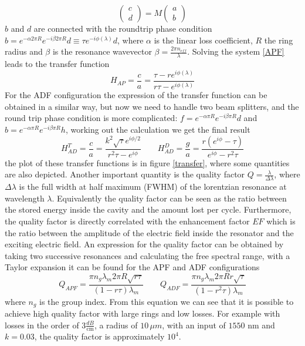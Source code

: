 \begin{equation}\label{APF}\begin{pmatrix}c \\ d \end{pmatrix} = M \begin{pmatrix}a\\b \end{pmatrix}\end{equation}
$b$ and $d$ are connected with the roundtrip phase condition $b = e^{-\alpha 2\pi R} e^{-i\beta 2\pi R}d \equiv\tau e^{-i\phi(\lambda)}d $, where $\alpha$ is the linear loss coefficient, $R$ the ring radius and $\beta$ is the resonance wavevector $\beta = \frac{2\pi n_{eff}}{\lambda}$. Solving the system \eqref{APF} leads to the transfer function
\begin{equation}H_{AP} = \frac{c}{a} = \frac{\tau - re^{i\phi(\lambda)}}{r\tau -e^{i\phi(\lambda)}}\end{equation}
For the ADF configuration the expression of the transfer function can be obtained in a similar way, but now we need to handle two beam splitters, and the round trip phase condition is more complicated: $f = e^{-\alpha \pi R} e^{-i\beta \pi R}d$ and $b=e^{-\alpha \pi R} e^{-i\beta \pi R}h$, working out the calculation we get the final result
\begin{equation}H^T_{AD} = \frac{c}{a} = \frac{k^2\sqrt{\tau} e^{i\phi/2}}{r^2\tau -e^{i\phi}}\qquad H^D_{AD} = \frac{g}{a} = \frac{r(e^{i\phi} - \tau)}{e^{i\phi}-r^2\tau} \end{equation}
the plot of these transfer functions is in figure \ref{transfer}, where some quantities are also depicted. Another important quantity is the quality factor $Q = \frac{\lambda}{\Delta \lambda}$, where $\Delta \lambda$ is the full width at half maximum (FWHM) of the lorentzian resonance at wavelength $\lambda$. Equivalently the quality factor can be seen as the ratio between the stored energy inside the cavity and the amount lost per cycle. Furthermore, the quality factor is directly correlated with the enhancement factor $EF$ which is the ratio between the amplitude of the electric field inside the resonator and the exciting electric field. An expression for the quality factor can be obtained by taking two successive resonances and calculating the free spectral range, with a Taylor expansion it can be found \cite{thesis:borghi} for the APF and ADF configurations
\begin{equation}
Q_{APF} = \frac{\pi n_g \lambda_m 2\pi R \sqrt{r\tau}}{(1-r\tau)\lambda_m} \qquad Q_{ADF} = \frac{\pi n_g \lambda_m 2\pi R r\sqrt{\tau}}{(1-r^2\tau)\lambda_m}
\end{equation}
where $n_g$ is the group index. From this equation we can see that it is possible to achieve high quality factor with large rings and low losses. For example with losses in the order of $3 \frac{dB}{\text{cm}}$, a radius of $10\, \mu m$, with an input of $1550$ nm and $k = 0.03$, the quality factor is approximately $10^4$.
